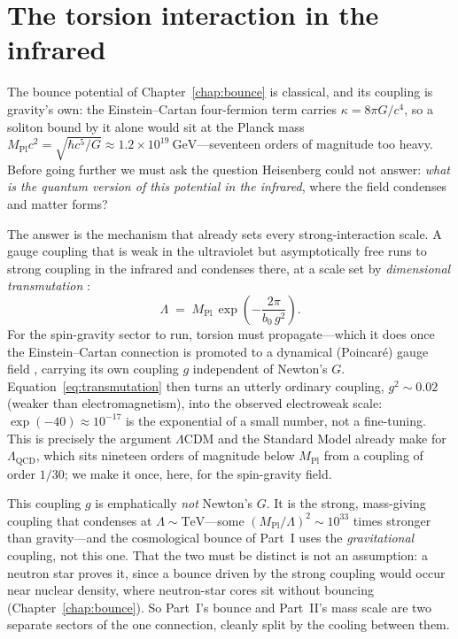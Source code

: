 \section{The torsion interaction in the infrared}
\label{sec:ir-potential}

The bounce potential of Chapter~\ref{chap:bounce} is classical, and its coupling is gravity's
own: the Einstein--Cartan four-fermion term carries $\kappa = 8\pi G/c^4$, so a soliton bound by
it alone would sit at the Planck mass $M_{\mathrm{Pl}}c^2=\sqrt{\hbar c^5/G}\approx
1.2\times10^{19}~\mathrm{GeV}$---seventeen orders of magnitude too heavy. Before going further we
must ask the question Heisenberg could not answer: \emph{what is the quantum version of this
potential in the infrared}, where the field condenses and matter forms?

The answer is the mechanism that already sets every strong-interaction scale. A gauge coupling
that is weak in the ultraviolet but asymptotically free runs to strong coupling in the infrared
and condenses there, at a scale set by \emph{dimensional transmutation} \citep{coleman1973}:
\begin{equation}
  \Lambda \;=\; M_{\mathrm{Pl}}\,\exp\!\left(-\frac{2\pi}{b_0\,g^2}\right).
  \label{eq:transmutation}
\end{equation}
For the spin-gravity sector to run, torsion must propagate---which it does once the
Einstein--Cartan connection is promoted to a dynamical (Poincar\'e) gauge field
\citep{kibble1961,sciama1964,hehl1976}, carrying its own coupling $g$ independent of Newton's
$G$. Equation~\eqref{eq:transmutation} then turns an utterly ordinary coupling, $g^2\sim0.02$
(weaker than electromagnetism), into the observed electroweak scale: $\exp(-40)\approx10^{-17}$
is the exponential of a small number, not a fine-tuning. This is precisely the argument
$\Lambda$CDM and the Standard Model already make for $\Lambda_{\mathrm{QCD}}$, which sits
nineteen orders of magnitude below $M_{\mathrm{Pl}}$ from a coupling of order $1/30$; we make it
once, here, for the spin-gravity field.

This coupling $g$ is emphatically \emph{not} Newton's $G$. It is the strong, mass-giving
coupling that condenses at $\Lambda\sim\mathrm{TeV}$---some $(M_{\mathrm{Pl}}/\Lambda)^2\sim
10^{33}$ times stronger than gravity---and the cosmological bounce of Part~I uses the
\emph{gravitational} coupling, not this one. That the two must be distinct is not an assumption:
a neutron star proves it, since a bounce driven by the strong coupling would occur near nuclear
density, where neutron-star cores sit without bouncing (Chapter~\ref{chap:bounce}). So Part~I's
bounce and Part~II's mass scale are two separate sectors of the one connection, cleanly split by
the cooling between them.

